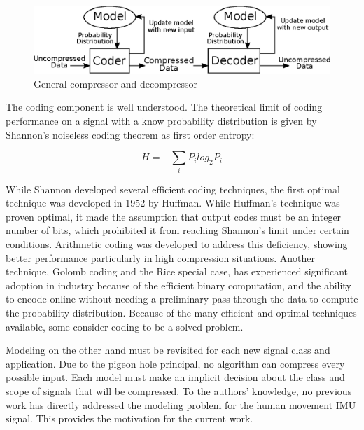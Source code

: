 \documentclass[journal]{IEEEtran}
\begin{document}
\begin{figure}
  \includegraphics[width=\linewidth]{general_compressor.eps}
  \caption{General compressor and decompressor}
  \label{fig:general_compressor}
\end{figure}

The coding component is well understood. The theoretical limit of coding performance on a signal with a know probability distribution is given by Shannon's noiseless coding theorem\cite{Shannon1948} as first order entropy:

$$H = -\sum_{i} P_ilog_2P_i$$

While Shannon developed several efficient coding techniques, the first optimal technique was developed in 1952 by Huffman\cite{Huffman1952}. While Huffman's technique was proven optimal, it made the assumption that output codes must be an integer number of bits, which prohibited it from reaching Shannon's limit under certain conditions. Arithmetic coding was developed to address this deficiency, showing better performance particularly in high compression situations\cite{Witten1987}. Another technique, Golomb coding and the Rice special case, has experienced significant adoption in industry because of the efficient binary computation, and the ability to encode online without needing a preliminary pass through the data to compute the probability distribution\cite{Golomb1966}\cite{F.Rice1979}. Because of the many efficient and optimal techniques available, some consider coding to be a solved problem\cite{Mahoney2013}.

Modeling on the other hand must be revisited for each new signal class and application. Due to the pigeon hole principal, no algorithm can compress every possible input\cite{Kolmogorov1965}. Each model must make an implicit decision about the class and scope of signals that will be compressed. To the authors' knowledge, no previous work has directly addressed the modeling problem for the human movement IMU signal. This provides the motivation for the current work.
\end{document}
